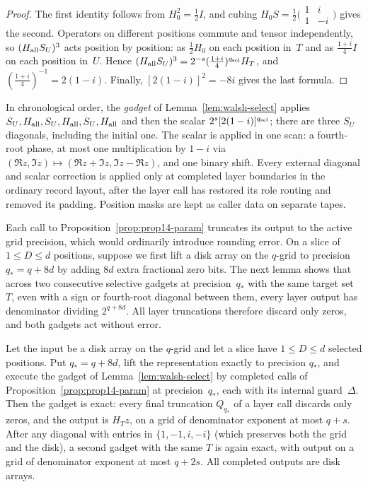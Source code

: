 \begin{proof}
The first identity follows from $H_0^2=\frac12I$, and cubing
$H_0S=\frac12\bigl(\begin{smallmatrix}1&i\\1&-i\end{smallmatrix}\bigr)$ gives the second. Operators on different
positions commute and tensor independently, so $(H_{\rm all}S_U)^3$ acts position by position: as $\frac12H_0$ on each
position in~$T$ and as $\frac{1+i}{4}I$ on each position in~$U$. Hence
$(H_{\rm all}S_U)^3=2^{-s}(\frac{1+i}{4})^{q_{\rm sel}}H_T$, and $(\frac{1+i}{4})^{-1}=2(1-i)$. Finally,
$[2(1-i)]^2=-8i$ gives the last formula.
\end{proof}

In chronological order, the \emph{gadget} of Lemma~\ref{lem:walsh-select} applies
$S_U,H_{\rm all},S_U,H_{\rm all},S_U,H_{\rm all}$ and then the scalar $2^s[2(1-i)]^{q_{\rm sel}}$; there are three
$S_U$ diagonals, including the initial one. The scalar is applied in one scan: a fourth-root phase, at most one
multiplication by $1-i$ via $(\Re z,\Im z)\mapsto(\Re z+\Im z,\Im z-\Re z)$, and one binary shift. Every external
diagonal and scalar correction is applied only at completed layer boundaries in the ordinary record layout, after the
layer call has restored its role routing and removed its padding. Position masks are kept as caller data on separate
tapes.

Each call to Proposition~\ref{prop:prop14-param} truncates its output to the active grid precision, which would
ordinarily introduce rounding error. On a slice of $1\le D\le d$ positions, suppose we first lift a disk array on the
$q$-grid to precision $q_*=q+8d$ by adding $8d$ extra fractional zero bits. The next lemma shows that across two
consecutive selective gadgets at precision~$q_*$ with the same target set~$T$, even with a sign or fourth-root diagonal
between them, every layer output has denominator dividing $2^{q+8d}$. All layer truncations therefore discard only zeros,
and both gadgets act without error.

\begin{lemma}\label{lem:walsh-exact}
Let the input be a disk array on the $q$-grid and let a slice have $1\le D\le d$ selected positions. Put $q_*=q+8d$,
lift the representation exactly to precision $q_*$, and execute the gadget of Lemma~\ref{lem:walsh-select} by completed
calls of Proposition~\ref{prop:prop14-param} at precision~$q_*$, each with its internal guard~$\Delta$. Then the gadget
is exact: every final truncation $Q_{q_*}$ of a layer call discards only zeros, and the output is $H_Tz$, on a grid of
denominator exponent at most $q+s$. After any diagonal with entries in $\{1,-1,i,-i\}$ (which preserves both the grid
and the disk), a second gadget with the same $T$ is again exact, with output on a grid of denominator exponent at most
$q+2s$. All completed outputs are disk arrays.
\end{lemma}

